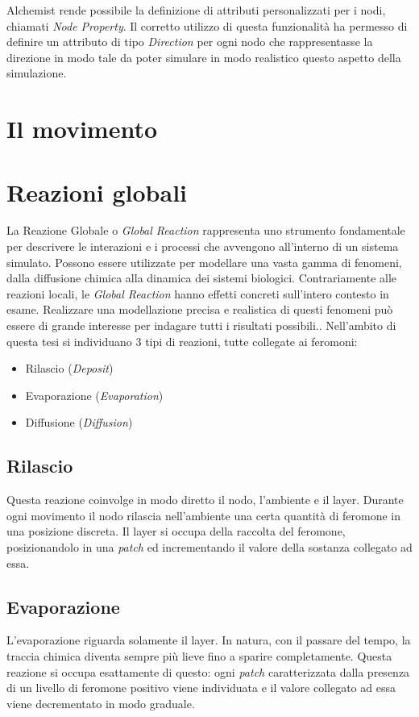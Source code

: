 Alchemist rende possibile la definizione di attributi personalizzati per i nodi, chiamati \textit{Node Property}. Il corretto utilizzo di questa
funzionalità ha permesso di definire un attributo di tipo \textit{Direction} per ogni nodo che rappresentasse la direzione 
in modo tale da poter simulare in modo realistico questo aspetto della simulazione.
\clearpage
\section{Il movimento}

\section{Reazioni globali}
La Reazione Globale o \textit{Global Reaction} rappresenta uno strumento fondamentale per descrivere
le interazioni e i processi che avvengono all'interno di un sistema simulato.
Possono essere utilizzate per modellare una vasta gamma di fenomeni, dalla diffusione chimica alla dinamica dei sistemi biologici.
Contrariamente alle reazioni locali, le \textit{Global Reaction} hanno effetti concreti sull'intero contesto in esame. 
Realizzare una modellazione precisa e realistica di questi fenomeni può essere di grande interesse per indagare tutti i risultati possibili.. 
Nell'ambito di questa tesi si individuano 3 tipi di reazioni, tutte collegate ai feromoni:
\begin{itemize}
    \item Rilascio (\textit{Deposit})
    \item Evaporazione (\textit{Evaporation})
    \item Diffusione (\textit{Diffusion})
\end{itemize}
\subsection{Rilascio}
Questa reazione coinvolge in modo diretto il nodo, l'ambiente e il layer. Durante ogni movimento il nodo rilascia 
nell'ambiente una certa quantità di feromone in una posizione discreta. Il layer si occupa della raccolta del feromone,
posizionandolo in una \textit{patch} ed incrementando il valore della sostanza collegato ad essa.
\subsection{Evaporazione}
L'evaporazione riguarda solamente il layer. In natura, con il passare del tempo, la traccia chimica diventa sempre più
lieve fino a sparire completamente. Questa reazione si occupa esattamente di questo: ogni \textit{patch} caratterizzata
dalla presenza di un livello di feromone positivo viene individuata e il valore collegato ad essa viene decrementato in modo graduale.
